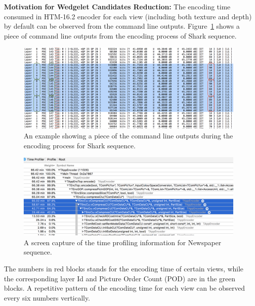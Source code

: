 \textbf{Motivation for Wedgelet Candidates Reduction:} The encoding time
consumed in HTM-16.2 encoder for
each view (including both texture and depth) by default can be
observed from the command line outputs.
Figure~\ref{fig:encoding-time-example} shows a piece of command line outputs
from the encoding process of Shark sequence.
\begin{figure}
    \centering
    \includegraphics[width=\textwidth,height=\textheight,keepaspectratio]{Figures/EncodingTimeEg}
    \caption[An example showing a piece of the command line outputs during
    the encoding process for Shark sequence]
    {An example showing a piece of the command line outputs during the
    encoding process for Shark sequence.
    }\label{fig:encoding-time-example}
\end{figure}
\begin{figure}[!b]
    \centering
    \includegraphics[width=\textwidth,height=\textheight,keepaspectratio]{Figures/major-time-spent-in-recursive-xcompresscu}
    \caption[A screen capture of the time profiling information for Newspaper sequence]
    {A screen capture of the time profiling information for Newspaper sequence.
    }\label{fig:major-time-spent-in-recursive-comresscu}
\end{figure}
The numbers in red blocks stands for the encoding time of certain views, while
the corresponding layer Id and Picture Order Count (POD) are in the green
blocks.
A repetitive pattern of the encoding time for each view can be observed
every six numbers vertically.
